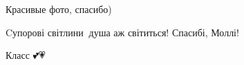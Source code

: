  
 
 
 
 

\qqSecCmt


Красивые фото, спасибо)


Cупорові світлини💛💙душа аж світиться! Спасибі, Моллі!


Класс 💕💗

